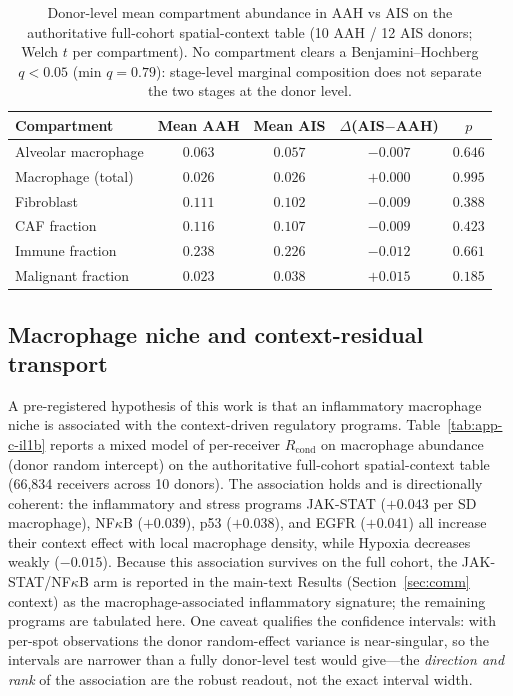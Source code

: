 \begin{table}[htbp]
  \centering
  \caption[Tissue-ecology composition, AAH vs AIS]{Donor-level mean compartment abundance in AAH vs
  AIS on the authoritative full-cohort spatial-context table (10 AAH / 12 AIS donors; Welch $t$ per
  compartment). No compartment clears a Benjamini--Hochberg $q<0.05$ (min $q=0.79$): stage-level
  marginal composition does not separate the two stages at the donor level.}
  \label{tab:app-c-ecology}
  \footnotesize
  \begin{tabular}{lcccc}
    \toprule
    Compartment & Mean AAH & Mean AIS & $\Delta$(AIS$-$AAH) & $p$ \\
    \midrule
    Alveolar macrophage & $0.063$ & $0.057$ & $-0.007$ & $0.646$ \\
    Macrophage (total)  & $0.026$ & $0.026$ & $+0.000$ & $0.995$ \\
    Fibroblast          & $0.111$ & $0.102$ & $-0.009$ & $0.388$ \\
    CAF fraction        & $0.116$ & $0.107$ & $-0.009$ & $0.423$ \\
    Immune fraction     & $0.238$ & $0.226$ & $-0.012$ & $0.661$ \\
    Malignant fraction  & $0.023$ & $0.038$ & $+0.015$ & $0.185$ \\
    \bottomrule
  \end{tabular}
\end{table}

\subsection{Macrophage niche and context-residual transport}
\label{sec:app-c-macrophage}

A pre-registered hypothesis of this work is that an inflammatory macrophage niche is associated with
the context-driven regulatory programs. Table~\ref{tab:app-c-il1b} reports a mixed model of
per-receiver $R_{\mathrm{cond}}$ on macrophage abundance (donor random intercept) on the authoritative
full-cohort spatial-context table (66{,}834 receivers across 10 donors). The association holds and is
directionally coherent: the inflammatory and stress programs JAK-STAT ($+0.043$ per SD macrophage),
NF$\kappa$B ($+0.039$), p53 ($+0.038$), and EGFR ($+0.041$) all increase their context effect with
local macrophage density, while Hypoxia decreases weakly ($-0.015$). Because this association survives
on the full cohort, the JAK-STAT/NF$\kappa$B arm is reported in the main-text Results
(Section~\ref{sec:comm} context) as the macrophage-associated inflammatory signature; the remaining
programs are tabulated here. One caveat qualifies the confidence intervals: with per-spot observations
the donor random-effect variance is near-singular, so the intervals are narrower than a fully
donor-level test would give---the \emph{direction and rank} of the association are the robust readout,
not the exact interval width.

